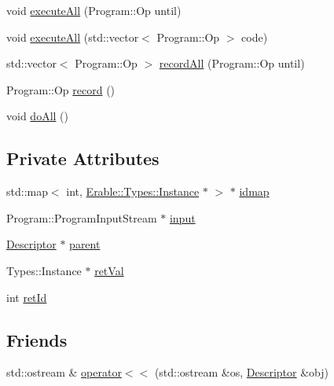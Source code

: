 \begin{DoxyCompactItemize}
\item 
void \mbox{\hyperlink{class_erable_1_1_descriptor_a64542c35bdca40b4cb39c2f9452251db}{execute\+All}} (Program\+::\+Op until)
\item 
void \mbox{\hyperlink{class_erable_1_1_descriptor_a72638ee8fe6c5063212d69af69b4602c}{execute\+All}} (std\+::vector$<$ Program\+::\+Op $>$ code)
\item 
std\+::vector$<$ Program\+::\+Op $>$ \mbox{\hyperlink{class_erable_1_1_descriptor_acd9e9c90e71d2e95af3aa8503e2b59b5}{record\+All}} (Program\+::\+Op until)
\item 
Program\+::\+Op \mbox{\hyperlink{class_erable_1_1_descriptor_a485977cfcdce99ef5224bf45949af255}{record}} ()
\item 
void \mbox{\hyperlink{class_erable_1_1_descriptor_a4e8aa3a2456928b76d8969286e96a270}{do\+All}} ()
\end{DoxyCompactItemize}
\subsection*{Private Attributes}
\begin{DoxyCompactItemize}
\item 
std\+::map$<$ int, \mbox{\hyperlink{class_erable_1_1_erable_1_1_types_1_1_instance}{Erable\+::\+Types\+::\+Instance}} $\ast$ $>$ $\ast$ \mbox{\hyperlink{class_erable_1_1_descriptor_a10946ca25cb512e8a4c765c517509c7f}{idmap}}
\item 
Program\+::\+Program\+Input\+Stream $\ast$ \mbox{\hyperlink{class_erable_1_1_descriptor_a75e285ecacfb1ac394fe90d178be84c4}{input}}
\item 
\mbox{\hyperlink{class_erable_1_1_descriptor}{Descriptor}} $\ast$ \mbox{\hyperlink{class_erable_1_1_descriptor_ac7d55cb4c5fb036dccc4310a7878ffab}{parent}}
\item 
Types\+::\+Instance $\ast$ \mbox{\hyperlink{class_erable_1_1_descriptor_a1c1bf3943d3d7cbd9776eccba247182f}{ret\+Val}}
\item 
int \mbox{\hyperlink{class_erable_1_1_descriptor_ae5ae8353191e79f315d97f5b752c8e3e}{ret\+Id}}
\end{DoxyCompactItemize}
\subsection*{Friends}
\begin{DoxyCompactItemize}
\item 
std\+::ostream \& \mbox{\hyperlink{class_erable_1_1_descriptor_abaf13535a8e1086f647a9d13e73d778e}{operator$<$$<$}} (std\+::ostream \&os, \mbox{\hyperlink{class_erable_1_1_descriptor}{Descriptor}} \&obj)
\end{DoxyCompactItemize}


